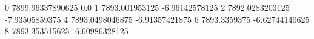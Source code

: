 0 7899.96337890625 0.0
1 7893.001953125 -6.96142578125
2 7892.0283203125 -7.93505859375
4 7893.0498046875 -6.91357421875
6 7893.3359375 -6.62744140625
8 7893.353515625 -6.60986328125
